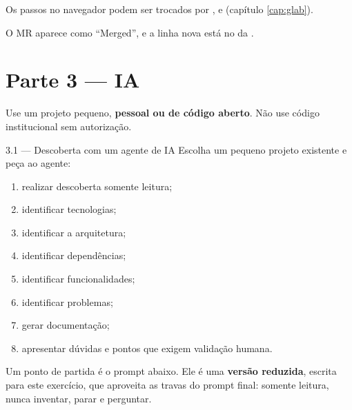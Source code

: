 \begin{dica}
Os passos no navegador podem ser trocados por ,  e  (capítulo \ref{cap:glab}).
\end{dica}

\begin{verifique}
O MR aparece como \enquote{Merged}, e a linha nova está no  da .
\end{verifique}

\section{Parte 3 — IA}

\begin{atencao}
Use um projeto pequeno, \textbf{pessoal ou de código aberto}. Não use código institucional sem autorização.
\end{atencao}

\begin{exercicio}{3.1 — Descoberta com um agente de IA}
Escolha um pequeno projeto existente e peça ao agente:
\begin{enumerate}
  \item realizar descoberta somente leitura;
  \item identificar tecnologias;
  \item identificar a arquitetura;
  \item identificar dependências;
  \item identificar funcionalidades;
  \item identificar problemas;
  \item gerar documentação;
  \item apresentar dúvidas e pontos que exigem validação humana.
\end{enumerate}
\end{exercicio}

Um ponto de partida é o prompt abaixo. Ele é uma \textbf{versão reduzida}, escrita para este exercício, que aproveita as travas do prompt final: somente leitura, nunca inventar, parar e perguntar.

